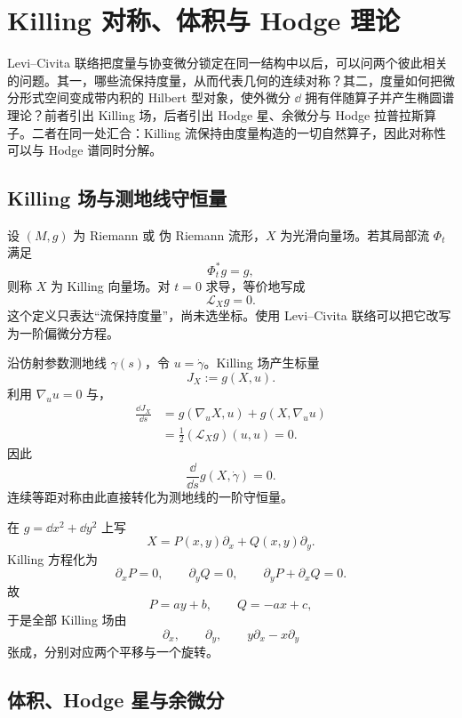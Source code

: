 \chapter{Killing 对称、体积与 Hodge 理论}

Levi--Civita 联络把度量与协变微分锁定在同一结构中以后，可以问两个彼此相关的问题。其一，哪些流保持度量，从而代表几何的连续对称？其二，度量如何把微分形式空间变成带内积的 Hilbert 型对象，使外微分 $\dd$ 拥有伴随算子并产生椭圆谱理论？前者引出 Killing 场，后者引出 Hodge 星、余微分与 Hodge 拉普拉斯算子。二者在同一处汇合：Killing 流保持由度量构造的一切自然算子，因此对称性可以与 Hodge 谱同时分解。

\section{Killing 场与测地线守恒量}

设 $(M,g)$ 为 Riemann 或 伪 Riemann 流形，$X$ 为光滑向量场。若其局部流 $\Phi_t$ 满足
\[
\Phi_t^*g=g,
\]
则称 $X$ 为 Killing 向量场。对 $t=0$ 求导，等价地写成
\begin{equation*}\boxed{\mathcal L_Xg=0.}
\end{equation*}
这个定义只表达“流保持度量”，尚未选坐标。使用 Levi--Civita 联络可以把它改写为一阶偏微分方程。

沿仿射参数测地线 $\gamma(s)$，令 $u=\dot\gamma$。Killing 场产生标量
\[
J_X:=g(X,u).
\]
利用 $\nabla_u u=0$ 与，
\[
\begin{aligned}
\frac{\dd J_X}{\dd s}
&=g(\nabla_uX,u)+g(X,\nabla_uu)\\
&=\frac12(\mathcal L_Xg)(u,u)=0.
\end{aligned}
\]
因此
\begin{equation*}\boxed{\frac{\dd}{\dd s}g(X,\dot\gamma)=0.}
\end{equation*}
连续等距对称由此直接转化为测地线的一阶守恒量。

\begin{exbox}
在 $g=\dd x^2+\dd y^2$ 上写
\[
X=P(x,y)\partial_x+Q(x,y)\partial_y.
\]
Killing 方程化为
\[
\partial_xP=0,
\qquad
\partial_yQ=0,
\qquad
\partial_yP+\partial_xQ=0.
\]
故
\[
P=ay+b,
\qquad
Q=-ax+c,
\]
于是全部 Killing 场由
\[
\partial_x,
\qquad
\partial_y,
\qquad
y\partial_x-x\partial_y
\]
张成，分别对应两个平移与一个旋转。
\end{exbox}

\section{体积、Hodge 星与余微分}

